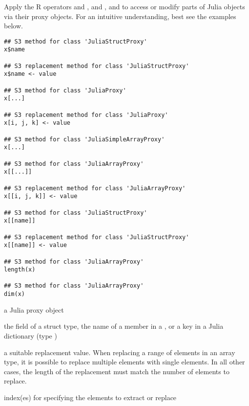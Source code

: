 \aliasA{[[<\Rdash{}.JuliaStructProxy}{AccessMutate.JuliaProxy}{[[<.Rdash..JuliaStructProxy}
%
\begin{Description}\relax
Apply the R operators \code{\$} and \code{\$<-}, \code{[} and \code{[<-}, \code{[[}
and \code{[[<-} to access or modify parts of Julia objects via their proxy objects.
For an intuitive understanding, best see the examples below.
\end{Description}
%
\begin{Usage}
\begin{verbatim}
## S3 method for class 'JuliaStructProxy'
x$name

## S3 replacement method for class 'JuliaStructProxy'
x$name <- value

## S3 method for class 'JuliaProxy'
x[...]

## S3 replacement method for class 'JuliaProxy'
x[i, j, k] <- value

## S3 method for class 'JuliaSimpleArrayProxy'
x[...]

## S3 method for class 'JuliaArrayProxy'
x[[...]]

## S3 replacement method for class 'JuliaArrayProxy'
x[[i, j, k]] <- value

## S3 method for class 'JuliaStructProxy'
x[[name]]

## S3 replacement method for class 'JuliaStructProxy'
x[[name]] <- value

## S3 method for class 'JuliaArrayProxy'
length(x)

## S3 method for class 'JuliaArrayProxy'
dim(x)
\end{verbatim}
\end{Usage}
%
\begin{Arguments}
\begin{ldescription}
\item[\code{x}] a Julia proxy object

\item[\code{name}] the field of a struct type, the name of a member in a ,
or a key in a Julia dictionary (type )

\item[\code{value}] a suitable replacement value.
When replacing a range of elements in an array type, it is possible to
replace multiple elements with single elements. In all other cases,
the length of the replacement must match the number of elements to replace.

\item[\code{i, j, k, ...}] index(es) for specifying the elements to extract or replace
\end{ldescription}
\end{Arguments}
